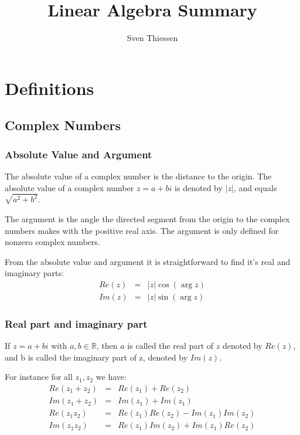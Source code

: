 \documentclass{article}
\begin{document}
	\title{Linear Algebra Summary}
	\author{Sven Thiessen}
	
	\maketitle
	\newpage
	
	\tableofcontents
	\newpage
	
	\section{Definitions}
		\subsection{Complex Numbers}
			\subsubsection{Absolute Value and Argument}
			The absolute value of a complex number is the distance to the origin. The absolute value of a complex number $z=a+bi$ is denoted by $|z|$, and equals $\sqrt{a^2+b^2}$.
			
			The argument is the angle the directed segment from the origin to the complex numbers makes with the positive real axis. The argument is only defined for nonzero complex numbers.
			
			From the absolute value and argument it is straightforward to find it's real and imaginary parts:
			\begin{eqnarray*}
				Re(z) &=& |z|\cos{(\arg{z})} \\
				Im(z) &=& |z|\sin{(\arg{z})}
			\end{eqnarray*}
			\subsubsection{Real part and imaginary part}
			If $z = a+bi$ with $a,b \in \mathbb{R}$, then $a$ is called the real part of $z$ denoted by $Re(z)$, and b is called the imaginary part of z, denoted by $Im(z)$.
			
			For instance for all $z_1,z_2$ we have:
			\begin{eqnarray*}
				Re(z_1+z_2) &=& Re(z_1) + Re(z_2) \\
				Im(z_1+z_2) &=& Im(z_1) + Im(z_1) \\
				Re(z_1z_2) &=& Re(z_1)Re(z_2) - Im(z_1)Im(z_2) \\
				Im(z_1z_2) &=& Re(z_1)Im(z_2) + Im(z_1)Re(z_2) \\
			\end{eqnarray*}
		
\end{document}
